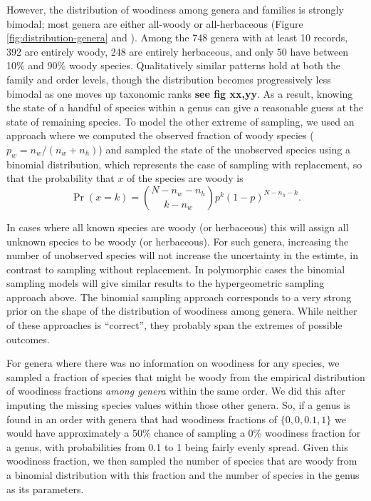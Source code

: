 \documentclass[a4paper,12pt]{article}
\begin{document}
However, the distribution of woodiness among genera and families is
strongly bimodal; most genera are either all-woody or all-herbaceous
(Figure \ref{fig:distribution-genera} and 
\citealt{sinnott1915evolution}).  Among the 748 genera with at least 10
records, 392 are entirely woody, 248 are entirely herbaceous, and only
50 have between 10\% and 90\% woody species. Qualitatively similar patterns
hold at both the family and order levels, though the distribution
becomes progressively less bimodal as one moves up taxonomic ranks 
\textbf{see fig xx,yy}. As a result, knowing the
state of a handful of species within a genus can give a reasonable
guess at the state of remaining species.
To model the other extreme of sampling, we used an approach where we
computed the observed fraction of woody species ($p_w = n_w / (n_w +
n_h)$) and sampled the state of the unobserved species using a
binomial distribution, which represents the case of sampling
with replacement, so that the probability that $x$ of the species
are woody is
\begin{equation}
  \Pr(x = k) = {N - n_w - n_h \choose k - n_w} 
  p^k (1-p)^{N - n_h - k}.
\end{equation}

In cases where all known species are woody (or herbaceous) this will
assign all unknown species to be woody (or herbaceous). For such genera,
increasing the number of unobserved species will not increase the uncertainty
in the estimte, in contrast to sampling without replacement.
In polymorphic
cases the binomial sampling models will give similar results to the 
hypergeometric sampling
approach above. The binomial sampling approach corresponds to a very strong 
prior on
the shape of the distribution of woodiness among genera.
While neither of these approaches is ``correct'', they probably
span the extremes of possible outcomes.

For genera where there was no information on woodiness for any
species, we sampled a fraction of species that might be woody from the
empirical distribution of woodiness fractions \textit{among genera}
within the same order. We did this after imputing the missing species
values within those other genera. So, if a genus is found in an order
with genera that had woodiness fractions of $\{0, 0, 0.1, 1\}$ we would
have approximately a 50\% chance of sampling a 0\% woodiness fraction
for a genus, with probabilities from 0.1 to 1 being fairly evenly
spread.  Given this woodiness fraction, we then sampled the number of
species that are woody from a binomial distribution with this fraction
and the number of species in the genus as its parameters.
\end{document}

